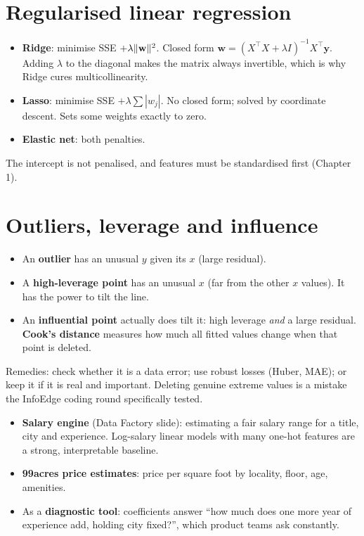 \section{Regularised linear regression}
\begin{itemize}
\item \textbf{Ridge}: minimise SSE $+\lambda\lVert \mathbf w\rVert^2$. Closed form $\mathbf w = (X^\top X + \lambda I)^{-1}X^\top\mathbf y$.
  Adding $\lambda$ to the diagonal makes the matrix always invertible, which is why Ridge cures multicollinearity.
\item \textbf{Lasso}: minimise SSE $+\lambda\sum|w_j|$. No closed form; solved by coordinate descent. Sets some
  weights exactly to zero.
\item \textbf{Elastic net}: both penalties.
\end{itemize}
The intercept is not penalised, and features must be standardised first (Chapter 1).

\section{Outliers, leverage and influence}
\begin{itemize}
\item An \textbf{outlier} has an unusual $y$ given its $x$ (large residual).
\item A \textbf{high-leverage point} has an unusual $x$ (far from the other $x$ values). It has the power to
  tilt the line.
\item An \textbf{influential point} actually does tilt it: high leverage \emph{and} a large residual.
  \textbf{Cook's distance} measures how much all fitted values change when that point is deleted.
\end{itemize}
Remedies: check whether it is a data error; use robust losses (Huber, MAE); or keep it if it is real and
important. Deleting genuine extreme values is a mistake the InfoEdge coding round specifically tested.

\begin{practical}
\begin{itemize}
\item \textbf{Salary engine} (Data Factory slide): estimating a fair salary range for a title, city and
  experience. Log-salary linear models with many one-hot features are a strong, interpretable baseline.
\item \textbf{99acres price estimates}: price per square foot by locality, floor, age, amenities.
\item As a \textbf{diagnostic tool}: coefficients answer ``how much does one more year of experience add, holding
  city fixed?'', which product teams ask constantly.
\end{itemize}
\end{practical}

